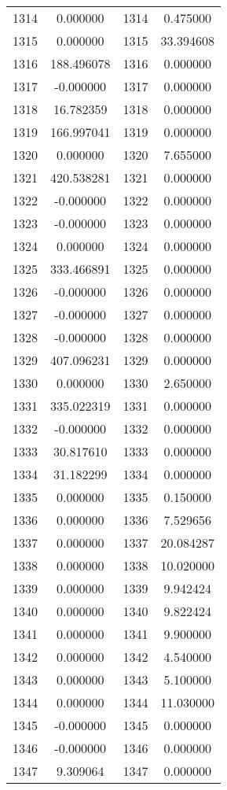 \documentclass[12pt]{article}
\begin{document}
\begin{longtable}{@{}cccc@{}}
1314 & 0.000000 & 1314 & 0.475000 \\
1315 & 0.000000 & 1315 & 33.394608 \\
1316 & 188.496078 & 1316 & 0.000000 \\
1317 & -0.000000 & 1317 & 0.000000 \\
1318 & 16.782359 & 1318 & 0.000000 \\
1319 & 166.997041 & 1319 & 0.000000 \\
1320 & 0.000000 & 1320 & 7.655000 \\
1321 & 420.538281 & 1321 & 0.000000 \\
1322 & -0.000000 & 1322 & 0.000000 \\
1323 & -0.000000 & 1323 & 0.000000 \\
1324 & 0.000000 & 1324 & 0.000000 \\
1325 & 333.466891 & 1325 & 0.000000 \\
1326 & -0.000000 & 1326 & 0.000000 \\
1327 & -0.000000 & 1327 & 0.000000 \\
1328 & -0.000000 & 1328 & 0.000000 \\
1329 & 407.096231 & 1329 & 0.000000 \\
1330 & 0.000000 & 1330 & 2.650000 \\
1331 & 335.022319 & 1331 & 0.000000 \\
1332 & -0.000000 & 1332 & 0.000000 \\
1333 & 30.817610 & 1333 & 0.000000 \\
1334 & 31.182299 & 1334 & 0.000000 \\
1335 & 0.000000 & 1335 & 0.150000 \\
1336 & 0.000000 & 1336 & 7.529656 \\
1337 & 0.000000 & 1337 & 20.084287 \\
1338 & 0.000000 & 1338 & 10.020000 \\
1339 & 0.000000 & 1339 & 9.942424 \\
1340 & 0.000000 & 1340 & 9.822424 \\
1341 & 0.000000 & 1341 & 9.900000 \\
1342 & 0.000000 & 1342 & 4.540000 \\
1343 & 0.000000 & 1343 & 5.100000 \\
1344 & 0.000000 & 1344 & 11.030000 \\
1345 & -0.000000 & 1345 & 0.000000 \\
1346 & -0.000000 & 1346 & 0.000000 \\
1347 & 9.309064 & 1347 & 0.000000 \\

\end{longtable}
\end{document}

